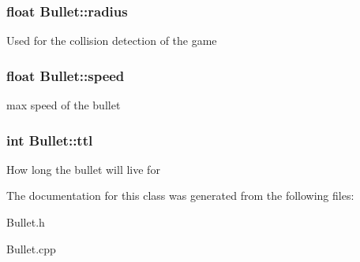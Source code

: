\subsubsection[{\texorpdfstring{radius}{radius}}]{\setlength{\rightskip}{0pt plus 5cm}float Bullet\+::radius\hspace{0.3cm}{\ttfamily [private]}}\hypertarget{class_bullet_af530c165781cd8524045bb075636aefc}{}\label{class_bullet_af530c165781cd8524045bb075636aefc}
Used for the collision detection of the game 
\subsubsection[{\texorpdfstring{speed}{speed}}]{\setlength{\rightskip}{0pt plus 5cm}float Bullet\+::speed\hspace{0.3cm}{\ttfamily [private]}}\hypertarget{class_bullet_a5fbd5204eec00c8285686abeb4547f16}{}\label{class_bullet_a5fbd5204eec00c8285686abeb4547f16}
max speed of the bullet 
\subsubsection[{\texorpdfstring{ttl}{ttl}}]{\setlength{\rightskip}{0pt plus 5cm}int Bullet\+::ttl\hspace{0.3cm}{\ttfamily [private]}}\hypertarget{class_bullet_a8b359e5e8cbd4739e2eb477e943ca558}{}\label{class_bullet_a8b359e5e8cbd4739e2eb477e943ca558}
How long the bullet will live for 

The documentation for this class was generated from the following files\+:\begin{DoxyCompactItemize}
\item 
Bullet.\+h\item 
Bullet.\+cpp\end{DoxyCompactItemize}
